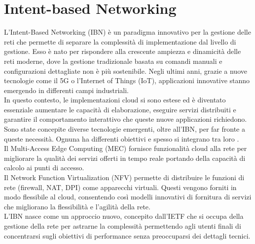 \section{Intent-based Networking}
\label{ch:IBN}
L'Intent-Based Networking (IBN) è un paradigma innovativo per la gestione delle reti che permette di separare la complessità di implementazione dal livello di gestione.
Esso è nato per rispondere alla crescente ampiezza e dinamicità delle reti moderne, dove la gestione tradizionale basata su comandi manuali e configurazioni dettagliate non è più sostenibile.
Negli ultimi anni, grazie a nuove tecnologie come il 5G o l'Internet of Things (IoT), applicazioni innovative stanno emergendo in differenti campi industriali.
\\In questo contesto, le implementazioni cloud si sono estese ed è diventato essenziale aumentare le capacità di elaborazione, eseguire servizi distribuiti e garantire il 
comportamento interattivo che queste nuove applicazioni richiedono.
\\Sono state concepite diverse tecnologie emergenti, oltre all'IBN, per far fronte a queste necessità. Ognuna ha differenti obiettivi e spesso si integrano tra loro \cite{ibn}.
\\Il Multi-Access Edge Computing\cite{mec} (MEC) fornisce funzionalità cloud alla rete per migliorare la qualità dei servizi offerti in tempo reale portando della capacità di calcolo ai punti di accesso.
\\Il Network Function Virtualization\cite{nfv} (NFV) permette di distribuire le funzioni di rete (firewall, NAT, DPI) come apparecchi virtuali. Questi vengono forniti in modo flessibile al cloud, consentendo 
così modelli innovativi di fornitura di servizi che migliorano la flessibilità e l'agilità della rete.
\\L'IBN nasce come un approccio nuovo, concepito dall'IETF \cite{ietf} che si occupa della gestione della rete per astrarne la complessità permettendo agli utenti finali di concentrarsi sugli obiettivi di performance senza preoccuparsi dei dettagli tecnici.
